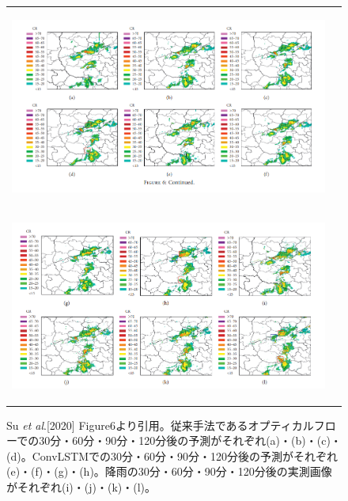 \begin{figure}[H]
	\begin{tabular}{cc}
		\begin{minipage}[t]{1.0\hsize}
		\begin{center}
		\includegraphics[width=1.0\linewidth,clip]{fig/intro/su-et-al-fig6-1.png}
		\label{a}
		\end{center}
		\end{minipage}\\
		
		\begin{minipage}[t]{1.0\hsize}	
		\begin{center}
		\includegraphics[width=1.0\linewidth,clip]{fig/intro/su-et-al-fig6-2.png}
		\label{b}
		\end{center}
		\end{minipage}
	\end{tabular}
	\caption{Su \textit{et al}.[2020] Figure6より引用。従来手法であるオプティカルフローでの30分・60分・90分・120分後の予測がそれぞれ(a)・(b)・(c)・(d)。ConvLSTMでの30分・60分・90分・120分後の予測がそれぞれ(e)・(f)・(g)・(h)。降雨の30分・60分・90分・120分後の実測画像がそれぞれ(i)・(j)・(k)・(l)。}
\end{figure}

